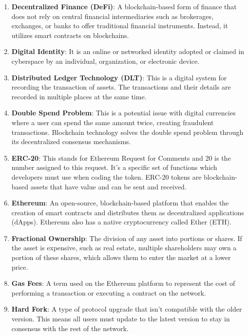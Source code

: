 \begin{enumerate}
    \item \textbf{Decentralized Finance (DeFi)}: A blockchain-based form of finance that does not rely on central financial intermediaries such as brokerages, exchanges, or banks to offer traditional financial instruments. Instead, it utilizes smart contracts on blockchains.

    \item \textbf{Digital Identity}: It is an online or networked identity adopted or claimed in cyberspace by an individual, organization, or electronic device.

    \item \textbf{Distributed Ledger Technology (DLT)}: This is a digital system for recording the transaction of assets. The transactions and their details are recorded in multiple places at the same time.

    \item \textbf{Double Spend Problem}: This is a potential issue with digital currencies where a user can spend the same amount twice, creating fraudulent transactions. Blockchain technology solves the double spend problem through its decentralized consensus mechanisms.

    \item \textbf{ERC-20}: This stands for Ethereum Request for Comments and 20 is the number assigned to this request. It's a specific set of functions which developers must use when coding the token. ERC-20 tokens are blockchain-based assets that have value and can be sent and received.

    \item \textbf{Ethereum}: An open-source, blockchain-based platform that enables the creation of smart contracts and distributes them as decentralized applications (dApps). Ethereum also has a native cryptocurrency called Ether (ETH).

    \item \textbf{Fractional Ownership}: The division of any asset into portions or shares. If the asset is expensive, such as real estate, multiple shareholders may own a portion of these shares, which allows them to enter the market at a lower price.

    \item \textbf{Gas Fees}: A term used on the Ethereum platform to represent the cost of performing a transaction or executing a contract on the network.

    \item \textbf{Hard Fork}: A type of protocol upgrade that isn't compatible with the older version. This means all users must update to the latest version to stay in consensus with the rest of the network.


\end{enumerate}

